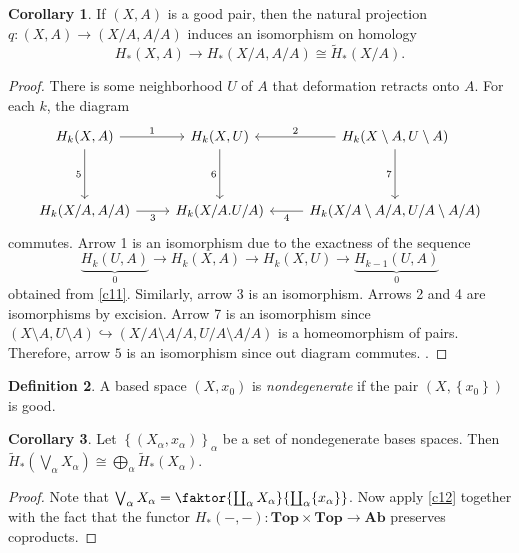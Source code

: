 \documentclass[10pt,letterpaper,cm]{nupset}
\theoremstyle{definition}
\newtheorem{definition}{Definition}[subsection]
\theoremstyle{theorem}
\newtheorem{corollary}[definition]{Corollary}
\theoremstyle{remark}
\newcommand{\1}{\mathbb{1}}
\newcommand{\0}{\vec 0}
\begin{document}
\begin{corollary}
If $\left(X,A\right)$ is a good pair, then the natural projection $q: \left(X, A\right) \to \left(X/A, A/A\right)$ induces an isomorphism on homology $$ H_{\ast}(X,A) \to H_{\ast}(X/A, A/A) \cong \widetilde{H}_{\ast}(X/A)  .$$
\end{corollary}
\begin{proof}
There is some neighborhood $U$ of $A$ that deformation retracts onto $A$. For each $k$, the diagram 
\[
\begin{tikzcd}
{H_k(X,A)} \arrow[dd, "5"'] \arrow[r, "1"] & {H_k(X,U)} \arrow[dd, "6"'] & {H_k(X\setminus A, U \setminus A)} \arrow[l, "2"'] \arrow[dd, "7"'] \\
                                           &                             &                                                                     \\
{H_k(X/A, A/A)} \arrow[r, "3"']            & H_k(X/A. U/A)               & {H_k(X/A \setminus A/A, U/A \setminus A/A)} \arrow[l, "4"]         
\end{tikzcd}
\] commutes. Arrow 1 is an isomorphism due to the exactness of the sequence $$\underbrace{H_k(U, A)}_{0} \to H_k(X,A) \to H_k(X,U) \to \underbrace{H_{k-1}(U,A)}_{0}$$ obtained from \cref{c11}. Similarly, arrow 3 is an isomorphism. Arrows 2 and 4 are isomorphisms by excision. Arrow 7 is an isomorphism since $\left(X\setminus A , U \setminus A\right) \hookrightarrow (X/A \setminus A/A, U/A \setminus A/A)$ is a homeomorphism of pairs. Therefore, arrow $5$ is an isomorphism since out diagram commutes. . 
\end{proof}

\begin{definition}
A based space $\left(X,x_0\right)$ is \textit{nondegenerate} if the pair $\left(X, \left\{x_0\right\}\right)$ is good. 
\end{definition}

\begin{corollary}
Let $\left\{(X_{\alpha}, x_{\alpha})\right\}_{\alpha}$ be a set of nondegenerate bases spaces. Then $\widetilde{H}_{\ast}\left(\bigvee_{\alpha} X_{\alpha}\right) \cong \bigoplus_{\alpha} \widetilde{H}_{\ast}(X_{\alpha}).$
\end{corollary}
\begin{proof}
Note that $\bigvee_{\alpha} X_{\alpha} = \faktor{\coprod_{\alpha}X_{\alpha}}{\coprod_{\alpha} \{x_{\alpha}\}}$. Now apply \cref{c12} together with the fact that the functor $H_{\ast}({-}, {-}): \mathbf{Top}\times \mathbf{Top} \to \mathbf{Ab}$ preserves coproducts. 
\end{proof}
\end{document}
